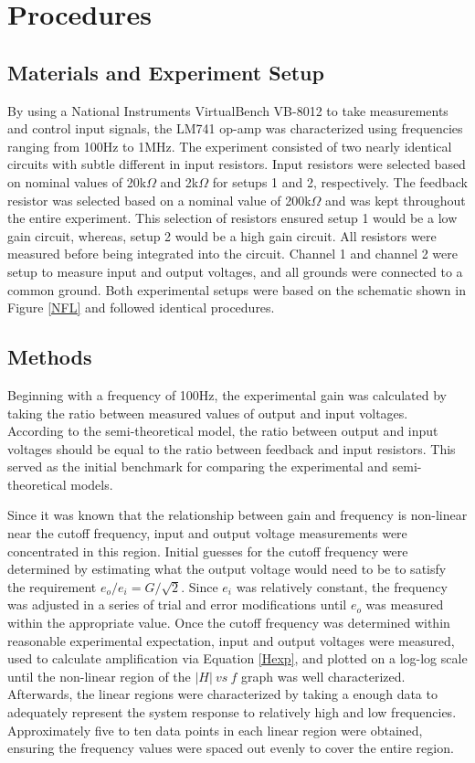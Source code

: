 \documentclass[letterpaper,12pt]{article}
\begin{document}
\section{Procedures}
\subsection{Materials and Experiment Setup}
By using a National Instruments VirtualBench VB-8012 to take measurements and control input signals, the LM741 op-amp was characterized using frequencies ranging from 100Hz to 1MHz. The experiment consisted of two nearly identical circuits with subtle different in input resistors. Input resistors were selected based on nominal values of 20k$\Omega$ and 2k$\Omega$ for setups 1 and 2, respectively. The feedback resistor was selected based on a nominal value of 200k$\Omega$ and was kept throughout the entire experiment. This selection of resistors ensured setup 1 would be a low gain circuit, whereas, setup 2 would be a high gain circuit.  All resistors were measured before being integrated into the circuit. Channel 1 and channel 2 were setup to measure input and output voltages, and all grounds were connected to a common ground. Both experimental setups were based on the schematic shown in Figure \ref{NFL} and followed identical procedures. 

\subsection{Methods}
Beginning with a frequency of 100Hz, the experimental gain was calculated by taking the ratio between measured values of output and input voltages. According to the semi-theoretical model, the ratio between output and input voltages should be equal to the ratio between feedback and input resistors. This served as the initial benchmark for comparing the experimental and semi-theoretical models.

Since it was known that the relationship between gain and frequency is non-linear near the cutoff frequency, input and output voltage measurements were concentrated in this region. Initial guesses for the cutoff frequency were determined by estimating what the output voltage would need to be to satisfy the requirement $e_o/e_i = G/\sqrt{2}$. Since $e_i$ was relatively constant, the frequency was adjusted in a series of trial and error modifications until $e_o$ was measured within the appropriate value. Once the cutoff frequency was determined within reasonable experimental expectation, input and output voltages were measured, used to calculate amplification via Equation \ref{Hexp}, and plotted on a log-log scale until the non-linear region of the $|H|\ vs\ f$ graph was well characterized. Afterwards, the linear regions were characterized by taking a enough data to adequately represent the system response to relatively high and low frequencies. Approximately five to ten data points in each linear region were obtained, ensuring the frequency values were spaced out evenly to cover the entire region.
\end{document}

